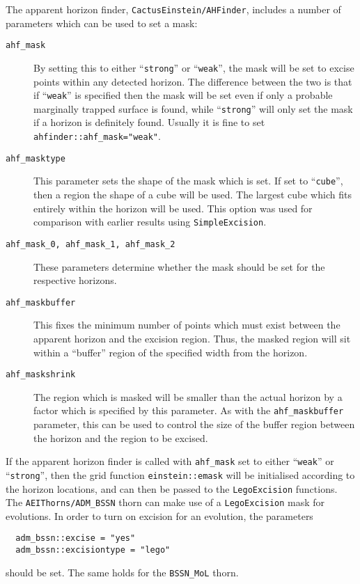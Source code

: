 \documentclass{article}
\begin{document}
The apparent horizon finder, \texttt{CactusEinstein/AHFinder},
includes a number of parameters which can be used to set a mask:
\begin{description}
  \item[\texttt{ahf\_mask}] By setting this to either
    ``\texttt{strong}'' or ``\texttt{weak}'', the mask will be set to
    excise points within any detected horizon. The difference between
    the two is that if ``\texttt{weak}'' is specified then the mask
    will be set even if only a probable marginally trapped surface is
    found, while ``\texttt{strong}'' will only set the mask if a
    horizon is definitely found. Usually it is fine to set
    \texttt{ahfinder::ahf\_mask="weak"}.
  \item[\texttt{ahf\_masktype}] This parameter sets the shape of the
    mask which is set. If set to ``\texttt{cube}'', then a region the
    shape of a cube will be used. The largest cube which fits entirely
    within the horizon will be used. This option was used for
    comparison with earlier results using \texttt{SimpleExcision}.
  \item[\texttt{ahf\_mask\_0, ahf\_mask\_1, ahf\_mask\_2}]
    These parameters determine whether the mask should be set for the
    respective horizons.
  \item[\texttt{ahf\_maskbuffer}] This fixes the minimum number of
    points which must exist between the apparent horizon and the
    excision region. Thus, the masked region will sit within a 
    ``buffer'' region of the specified width from the horizon.
  \item[\texttt{ahf\_maskshrink}] The region which is masked will be
    smaller than the actual horizon by a factor which is specified by
    this parameter. As with the \texttt{ahf\_maskbuffer} parameter,
    this can be used to control the size of the buffer region between
    the horizon and the region to be excised.
\end{description}

If the apparent horizon finder is called with \texttt{ahf\_mask} set
to either ``\texttt{weak}'' or ``\texttt{strong}'', then the grid
function \texttt{einstein::emask} will be initialised according to the
horizon locations, and can then be passed to the \texttt{LegoExcision}
functions.\\

The \texttt{AEIThorns/ADM\_BSSN} thorn can make use of a
\texttt{LegoExcision} mask for evolutions. In order to turn on
excision for an evolution, the parameters
\begin{verbatim}
  adm_bssn::excise = "yes"
  adm_bssn::excisiontype = "lego"
\end{verbatim}
should be set. The same holds for the \texttt{BSSN\_MoL} thorn.\\
\end{document}
